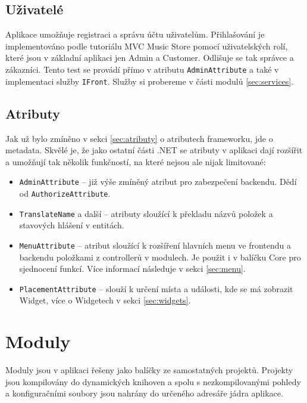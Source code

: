 \documentclass[11pt,twoside,a4paper]{book}
\begin{document}
\subsection{Uživatelé}

Aplikace umožňuje registraci a správu účtu uživatelům. Přihlašování je implementováno podle tutoriálu MVC Music Store \cite{musicstore} pomocí uživatelských rolí, které jsou v základní aplikaci jen \textsf{Admin} a \textsf{Customer}. Odlišuje se tak správce a zákazníci. Tento test se provádí přímo v atributu \texttt{AdminAttribute} a také v implementaci služby \texttt{IFront}. Služby si probereme v části modulů \ref{sec:services}.

\subsection{Atributy}

Jak už bylo zmíněno v sekci \ref{sec:atributy} o atributech frameworku, jde o metadata. Skvělé je, že jako ostatní části .NET se atributy v aplikaci dají rozšířit a umožňují tak několik funkčností, na které nejsou ale nijak limitované:

\begin{itemize}
\item \texttt{AdminAttribute} -- již výše zmíněný atribut pro zabezpečení backendu. Dědí od \texttt{Authorize\-Attribute}.
\item \texttt{TranslateName} a další -- atributy sloužící k překladu názvů položek  a stavových hlášení v entitách.
\item \texttt{MenuAttribute} -- atribut sloužící k rozšíření hlavních menu ve frontendu a backendu položkami z controllerů v modulech. Je použit i v balíčku \textsf{Core} pro sjednocení funkcí. Více informací následuje v sekci \ref{sec:menu}.
\item \texttt{PlacementAttribute} -- slouží k určení místa a události, kde se má zobrazit \textsf{Widget}, více o Widgetech v sekci \ref{sec:widgets}.
\end{itemize}


\section{Moduly}
\label{sec:moduly}
Moduly jsou v aplikaci řešeny jako balíčky ze samostatných projektů. Projekty jsou kompilovány do dynamických knihoven a spolu s nezkompilovanými pohledy a konfiguračními soubory jsou nahrány do určeného adresáře jádra aplikace. 
\end{document}
